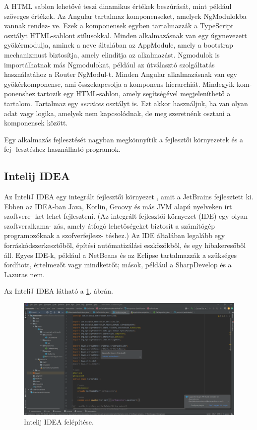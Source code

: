 A HTML sablon lehetővé teszi dinamikus értékek beszúrását, mint például szöveges értékek. Az Angular tartalmaz komponenseket, amelyek NgModulokba vannak rendez-
ve. Ezek a komponensek egyben tartalmazzák a TypeScript osztályt HTML-sablont stílusokkal. Minden alkalmazásnak van egy úgynevezett gyökérmodulja, aminek a neve általában az AppModule, amely a bootstrap mechanizmust biztosítja, amely elindítja az alkalmazást. Ngmodulok is importálhatnak más Ngmodulokat, például az útválasztó szolgáltatás használatához a Router NgModul-t.  Minden Angular alkalmazásnak van egy gyökérkomponense, ami összekapcsolja a komponens hierarchiát. Mindegyik kom-
ponenshez tartozik egy HTML-sablon, amely segítségével megjeleníthető a tartalom. Tartalmaz egy \textit{services} osztályt is. Ezt akkor használjuk, ha van olyan adat vagy logika, amelyek nem kapcsolódnak, de meg szeretnénk osztani a komponensek között.


Egy alkalmazás fejlesztését nagyban megkönnyítik a fejlesztői környezetek és a fej-
lesztéshez használható programok.
\subsection{Intelij IDEA}

Az InteliJ IDEA \cite{Intelij} egy integrált fejlesztői környezet \cite{Intelij2}, amit a JetBrains fejlesztett ki. Ebben az IDEA-ban Java, Kotlin, Groovy és más JVM alapú nyelveken írt szoftvere-
ket lehet fejleszteni. (Az integrált fejlesztői környezet (IDE)  egy olyan  szoftveralkama-
zás, amely átfogó lehetőségeket biztosít a számítógép programozóknak a szofverfejlesz-
téshez.) Az IDE általában legalább egy forráskódszerkesztőből, építési autómatizálási eszközökből, és egy hibakeresőből áll. Egyes IDE-k, például a NetBeans és az Eclipse tartalmazzák a szükséges fordított, értelmezőt vagy mindkettőt; mások, például a SharpDevelop és a Lazuras nem.

Az InteliJ IDEA látható a \ref{fig:Intelij}. ábrán.

\begin{figure}[h]
\centering
\includegraphics[scale=1]{images/Intelij.png}
\caption{Intelij IDEA felépítése.}
\label{fig:Intelij}
\end{figure}

